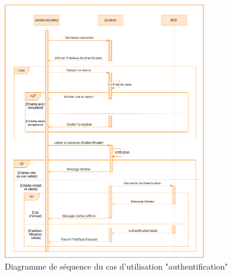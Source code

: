 \documentclass[edit,12pt,a4paper,ChapStyle,oneside,doubleinterligne]{report}
\begin{document}
\begin{figure}[h!]\label{fig:Diagramme cas2}
\centering
\includegraphics[width=0.8\textwidth]{images/authentifier.png}
\caption{Diagramme de séquence du cas d'utilisation "authentification"}
\end{figure}

\clearpage
\end{document}
